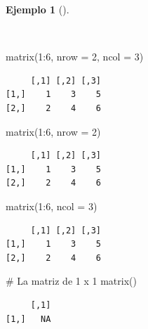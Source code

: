 \documentclass[
  spanish,
  a4paper,
]{scrreport}
\newenvironment{Shaded}{\begin{snugshade}}{\end{snugshade}}
\newcommand{\AttributeTok}[1]{\textcolor[rgb]{0.40,0.45,0.13}{#1}}
\newcommand{\CommentTok}[1]{\textcolor[rgb]{0.37,0.37,0.37}{#1}}
\newcommand{\DecValTok}[1]{\textcolor[rgb]{0.68,0.00,0.00}{#1}}
\newcommand{\FunctionTok}[1]{\textcolor[rgb]{0.28,0.35,0.67}{#1}}
\newcommand{\NormalTok}[1]{\textcolor[rgb]{0.00,0.23,0.31}{#1}}
\newcommand{\SpecialCharTok}[1]{\textcolor[rgb]{0.37,0.37,0.37}{#1}}
\theoremstyle{definition}
\theoremstyle{definition}
\newtheorem{example}{Ejemplo}[chapter]
\theoremstyle{remark}
\begin{document}
\begin{example}[]\protect\hypertarget{exm-creacion-matrices}{}\label{exm-creacion-matrices}

~

\begin{Shaded}
\begin{Highlighting}[]
\FunctionTok{matrix}\NormalTok{(}\DecValTok{1}\SpecialCharTok{:}\DecValTok{6}\NormalTok{, }\AttributeTok{nrow =} \DecValTok{2}\NormalTok{, }\AttributeTok{ncol =} \DecValTok{3}\NormalTok{)}
\end{Highlighting}
\end{Shaded}

\begin{verbatim}
     [,1] [,2] [,3]
[1,]    1    3    5
[2,]    2    4    6
\end{verbatim}

\begin{Shaded}
\begin{Highlighting}[]
\FunctionTok{matrix}\NormalTok{(}\DecValTok{1}\SpecialCharTok{:}\DecValTok{6}\NormalTok{, }\AttributeTok{nrow =} \DecValTok{2}\NormalTok{)}
\end{Highlighting}
\end{Shaded}

\begin{verbatim}
     [,1] [,2] [,3]
[1,]    1    3    5
[2,]    2    4    6
\end{verbatim}

\begin{Shaded}
\begin{Highlighting}[]
\FunctionTok{matrix}\NormalTok{(}\DecValTok{1}\SpecialCharTok{:}\DecValTok{6}\NormalTok{, }\AttributeTok{ncol =} \DecValTok{3}\NormalTok{)}
\end{Highlighting}
\end{Shaded}

\begin{verbatim}
     [,1] [,2] [,3]
[1,]    1    3    5
[2,]    2    4    6
\end{verbatim}

\begin{Shaded}
\begin{Highlighting}[]
\CommentTok{\# La matriz de 1 x 1 }
\FunctionTok{matrix}\NormalTok{()}
\end{Highlighting}
\end{Shaded}

\begin{verbatim}
     [,1]
[1,]   NA
\end{verbatim}

\end{example}
\end{document}
